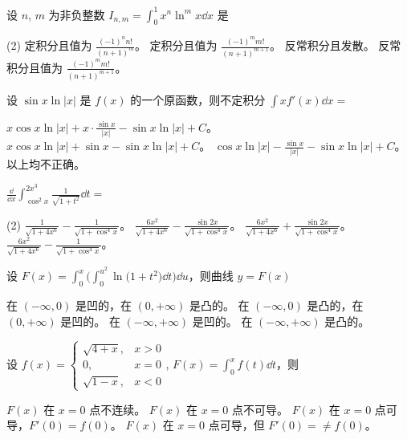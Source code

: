 \begin{ti}
	设 $n$, $m$ 为非负整数 $I_{n,m} = \int_0^1 x^n \ln^m x \dd{x}$ 是
	\begin{tasks}(2)
		\task 定积分且值为 $\frac{(-1)^n n!}{(n+1)^m}$。
		\task 定积分且值为 $\frac{(-1)^m m!}{(n+1)^{m+1}}$。
		\task 反常积分且发散。
		\task 反常积分且值为 $\frac{(-1)^m m!}{(n+1)^{m+1}}$。
	\end{tasks}
\end{ti}

\begin{ti}
	设 $\sin x \ln|x|$ 是 $f(x)$ 的一个原函数，则不定积分 $\int x f'(x) \dd{x} = $
	\begin{tasks}
		\task $x \cos x \ln|x| + x \cdot \frac{\sin x}{|x|} - \sin x \ln|x| + C$。
		\task $x \cos x \ln|x| + \sin x - \sin x \ln|x| + C$。
		\task $\cos x \ln|x| - \frac{\sin x}{|x|} - \sin x \ln|x| + C$。
		\task 以上均不正确。
	\end{tasks}
\end{ti}

\begin{ti}
	$\frac{\dd}{\dd{x}} \int_{\cos^2x}^{2x^3} \frac{1}{\sqrt{1+t^2}} \dd{t} = $
	\begin{tasks}(2)
		\task $\frac{1}{\sqrt{1+4x^6}} - \frac{1}{\sqrt{1+\cos^4x}}$。
		\task $\frac{6x^2}{\sqrt{1+4x^6}} - \frac{\sin 2x}{\sqrt{1+\cos^4x}}$。
		\task $\frac{6x^2}{\sqrt{1+4x^6}} + \frac{\sin 2x}{\sqrt{1+\cos^4x}}$。
		\task $\frac{6x^2}{\sqrt{1+4x^6}} - \frac{1}{\sqrt{1+\cos^4x}}$。
	\end{tasks}
\end{ti}

\begin{ti}
	设 $F(x) = \int_0^x \biggl( \int_0^{u^2} \ln \bigl( 1 + t^2 \bigr) \dd{t} \biggr) \dd{u}$，则曲线 $y = F(x)$
	\begin{tasks}
		\task 在 $(-\infty,0)$ 是凹的，在 $(0,+\infty)$ 是凸的。
		\task 在 $(-\infty,0)$ 是凸的，在 $(0,+\infty)$ 是凹的。
		\task 在 $(-\infty,+\infty)$ 是凹的。
		\task 在 $(-\infty,+\infty)$ 是凸的。
	\end{tasks}
\end{ti}

\begin{ti}
	设 $f(x) = \begin{cases}
		\sqrt{4+x}, & x > 0 \\
		0, & x = 0 \\
		\sqrt{1-x}, & x < 0
	\end{cases}$, $F(x) = \int_0^x f(t) \dd{t}$，则
	\begin{tasks}
		\task $F(x)$ 在 $x=0$ 点不连续。
		\task $F(x)$ 在 $x=0$ 点不可导。
		\task $F(x)$ 在 $x=0$ 点可导，$F'(0) = f(0)$。
		\task $F(x)$ 在 $x=0$ 点可导，但 $F'(0) =\ne f(0)$。
	\end{tasks}
\end{ti}

